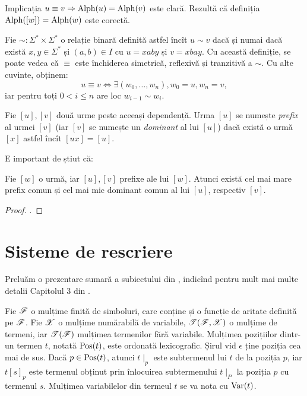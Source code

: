 Implicația $ u \equiv v \Rightarrow \mathrm{Alph}(u) = \mathrm{Alph}(v) $ este clară.
Rezultă că definiția $ \mathrm{Alph}([w]) = \mathrm{Alph}(w) $ este corectă.

Fie $ \sim : \Sigma^\ast \times \Sigma^\ast $ o relație binară definită
astfel încît $ u \sim v $ dacă și numai dacă există $ x, y \in \Sigma^\ast $
și $ (a,b) \in I $ cu $ u = xaby $ și $ v = xbay $. Cu această definiție,
se poate vedea că $ \equiv $ este închiderea simetrică, reflexivă și
tranzitivă a $ \sim $. Cu alte cuvinte, obținem:
\[
    u \equiv v \Leftrightarrow \exists (w_0, \dots, w_n), w_0 = u, w_n = v,
\]
iar pentru toți $ 0 < i \leq n $ are loc $ w_{i-1} \sim w_i $.

Fie $ [u], [v] $ două urme peste aceeași dependență. Urma $ [u] $ se numește
\emph{prefix} al urmei $ [v] $ (iar $ [v] $ se numește un \emph{dominant}
al lui $ [u] $) dacă există o urmă $ [x] $ astfel încît $ [ux] = [u] $.

E important de știut că:
\begin{proposition}\label{prop:lcm}
    Fie $ [w] $ o urmă, iar $ [u], [v] $ prefixe ale lui $ [w] $. Atunci
    există cel mai mare prefix comun și cel mai mic dominant comun al lui
    $ [u] $, respectiv $ [v] $.
\end{proposition}

\begin{proof}
    \cite[Prop.\ 1.3.5]{mazu}.
\end{proof}

\section{Sisteme de rescriere}

Preluăm o prezentare sumară a subiectului din \cite{10.1007/10721959_21},
indicînd pentru mult mai multe detalii Capitolul 3 din \cite{handbook}.

Fie $ \mathscr{F} $ o mulțime finită de simboluri, care conține și o funcție
de aritate definită pe $ \mathscr{F} $. Fie $ \mathscr{X} $ o mulțime numărabilă
de variabile, $ \mathscr{T}(\mathscr{F}, \mathscr{X}) $ o mulțime de termeni, iar
$ \mathscr{T}(\mathscr{F}) $ mulțimea termenilor fără variabile. Mulțimea
pozițiilor dintr-un termen $ t $, notată $ \mathrm{Pos}(t) $, este ordonată
lexicografic. Șirul vid $ \epsilon $ ține poziția cea mai de sus. Dacă
$ p \in \mathrm{Pos}(t) $, atunci $ t\mid_p $ este subtermenul lui $ t $
de la poziția $ p $, iar $ t[s]_p $ este termenul obținut prin
înlocuirea subtermenului $ t\mid_P $ la poziția $ p $ cu
termenul $ s $. Mulțimea variabilelor din termeul $ t $ se va nota cu
$ \mathrm{Var}(t) $.

